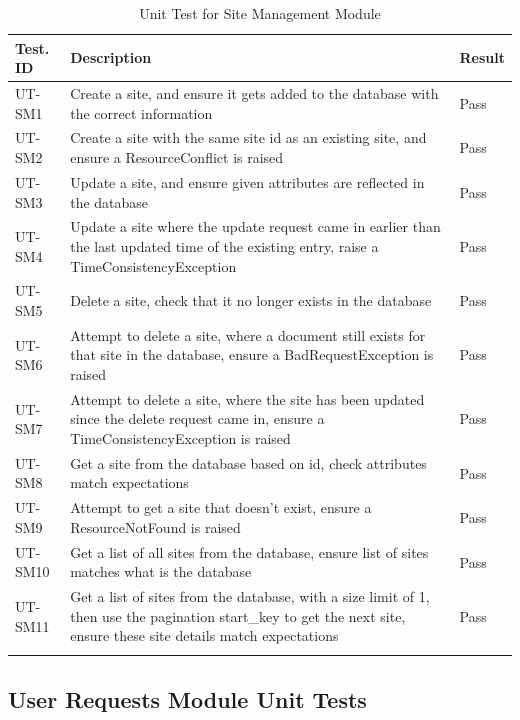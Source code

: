 \documentclass[12pt, titlepage]{article}
\begin{document}
\begin{longtable}{|m{2cm}|m{10cm}|m{1.4cm}|}
  \hline
  \textbf{Test. ID} & \textbf{Description} & \textbf{Result} \\ \hline
  UT-SM1 & Create a site, and ensure it gets added to the
  database with the correct information & Pass\\ \hline
  UT-SM2 & Create a site with the same site id as an existing site,
  and ensure a ResourceConflict is raised & Pass\\ \hline
  UT-SM3 & Update a site, and ensure given attributes are reflected
  in the database & Pass\\ \hline
  UT-SM4 & Update a site where the update request came in earlier
  than the last updated time of the existing entry, raise a
  TimeConsistencyException & Pass\\ \hline
  UT-SM5 & Delete a site, check that it no longer exists in the
  database & Pass\\ \hline
  UT-SM6 & Attempt to delete a site, where a document still exists
  for that site in the database, ensure a BadRequestException is
  raised & Pass\\ \hline
  UT-SM7 & Attempt to delete a site, where the site has been updated
  since the delete request came in, ensure a TimeConsistencyException
  is raised & Pass\\ \hline
  UT-SM8 & Get a site from the database based on id, check attributes
  match expectations & Pass\\ \hline
  UT-SM9 & Attempt to get a site that doesn't exist, ensure a
  ResourceNotFound is raised & Pass\\ \hline
  UT-SM10 & Get a list of all sites from the database, ensure list of
  sites matches what is the database & Pass\\ \hline
  UT-SM11 & Get a list of sites from the database, with a size limit
  of 1, then use the pagination start\_key to get the next site,
  ensure these site details match expectations & Pass\\ \hline
  \caption{Unit Test for Site Management Module}
\end{longtable}

\subsection{User Requests Module Unit Tests}
\end{document}
